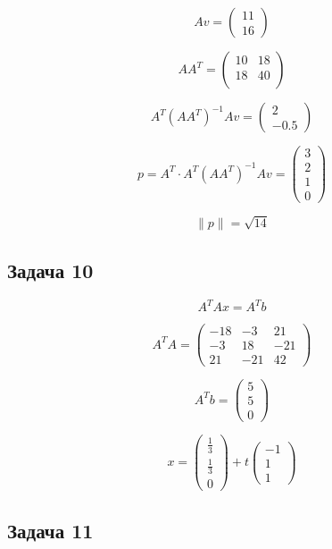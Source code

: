 \documentclass[a4paper,12pt]{article}
\begin{document}
\[
Av = \begin{pmatrix}
    11 \\ 16
\end{pmatrix}
\]

\[
AA^T = \begin{pmatrix}
    10 & 18 \\
    18 & 40 \\
\end{pmatrix}
\]

\[
A^T(AA^T)^{-1}Av = \begin{pmatrix}
    2 \\ -0.5
\end{pmatrix}
\]

\[
p = A^T \cdot A^T(AA^T)^{-1}Av = \begin{pmatrix}
    3 \\ 2 \\ 1 \\ 0
\end{pmatrix}
\]

\[
\|p\| = \sqrt{14}
\]

\subsection{Задача 10}
\[
A^TAx = A^Tb
\]

\[
A^TA = \begin{pmatrix}
-18 & -3 & 21 \\
-3 & 18 & -21 \\
21 & -21 & 42 
\end{pmatrix}
\]

\[
A^Tb =
\begin{pmatrix}
5 \\ 5 \\ 0
\end{pmatrix}
\]

\[
x = \begin{pmatrix}
    \frac{1}{3} \\ \frac{1}{3} \\ 0  
\end{pmatrix} + t \begin{pmatrix}
    -1 \\ 1 \\ 1
\end{pmatrix}
\]

\subsection{Задача 11}
\end{document}
